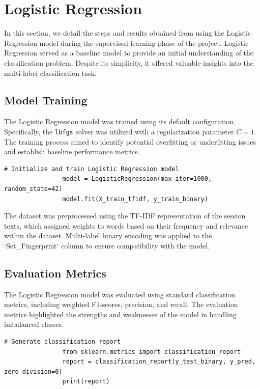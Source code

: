
\appendix

\section{Logistic Regression}

In this section, we detail the steps and results obtained from using the Logistic Regression model during the supervised learning phase of the project. Logistic Regression served as a baseline model to provide an initial understanding of the classification problem. Despite its simplicity, it offered valuable insights into the multi-label classification task.

\subsection{Model Training}
The Logistic Regression model was trained using its default configuration. Specifically, the \texttt{lbfgs} solver was utilized with a regularization parameter \( C = 1 \). The training process aimed to identify potential overfitting or underfitting issues and establish baseline performance metrics.

        \begin{lstlisting}[caption={Train Logistic Regression model}, label={lst:logistic_regression_train}]
                # Initialize and train Logistic Regression model
                model = LogisticRegression(max_iter=1000, random_state=42)
                model.fit(X_train_tfidf, y_train_binary)
        \end{lstlisting}

The dataset was preprocessed using the TF-IDF representation of the session texts, which assigned weights to words based on their frequency and relevance within the dataset. Multi-label binary encoding was applied to the `Set\_Fingerprint` column to ensure compatibility with the model.

\subsection{Evaluation Metrics}
The Logistic Regression model was evaluated using standard classification metrics, including weighted F1-scores, precision, and recall. The evaluation metrics highlighted the strengths and weaknesses of the model in handling imbalanced classes. 

        \begin{lstlisting}[caption={Generate classification report}, label={lst:logistic_regression_eval}]
                # Generate classification report
                from sklearn.metrics import classification_report
                report = classification_report(y_test_binary, y_pred, zero_division=0)
                print(report)
        \end{lstlisting}

